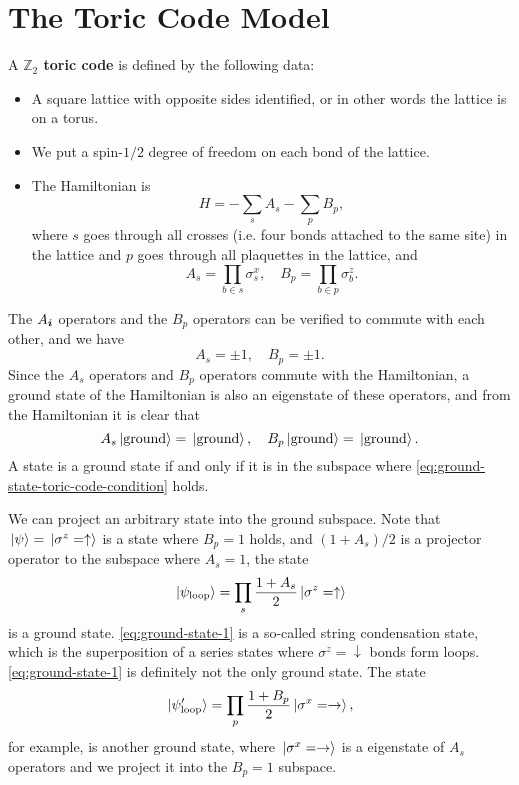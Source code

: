 \documentclass[hyperref, a4paper]{article}
\newcommand*{\concept}[1]{{\textbf{#1}}}
\begin{document}
\section{The Toric Code Model}

A \concept{$\mathbb{Z}_2$ toric code} is defined by the following data:
\begin{itemize}
    \item A square lattice with opposite sides identified, or in other words the lattice is on a torus.
    \item We put a spin-$1/2$ degree of freedom on each bond of the lattice.
    \item The Hamiltonian is 
    \begin{equation}
        H = - \sum_{s} A_{s} - \sum_{p} B_p,
        \label{eq:toric-code}
    \end{equation}
    where $s$ goes through all crosses (i.e. four bonds attached to the same site) in the lattice and $p$ goes through all plaquettes in the lattice, and 
    \begin{equation}
        A_s = \prod_{b \in s} \sigma^x_s, \quad B_p = \prod_{b \in p} \sigma^z_b.
    \end{equation}
\end{itemize}

The $A_{\vb*{i}}$ operators and the $B_{p}$ operators can be verified to commute with each other, and we have 
\begin{equation}
    A_s = \pm 1, \quad B_p = \pm 1.
\end{equation}
Since the $A_s$ operators and $B_p$ operators commute with the Hamiltonian, 
a ground state of the Hamiltonian is also an eigenstate of these operators, 
and from the Hamiltonian it is clear that 
\begin{equation}
    A_s \ket*{\text{ground}} = \ket*{\text{ground}}, \quad B_p \ket*{\text{ground}} = \ket*{\text{ground}}.
    \label{eq:ground-state-toric-code-condition}
\end{equation}
A state is a ground state if and only if it is in the subspace where \eqref{eq:ground-state-toric-code-condition} holds.

We can project an arbitrary state into the ground subspace. 
Note that $\ket*{\psi} = \ket*{\sigma^z = \uparrow}$ is a state where $B_p = 1$ holds, 
and $(1 + A_s)/{2}$ is a projector operator to the subspace where $A_s = 1$, the state 
\begin{equation}
    \ket*{\psi_\text{loop}} = \prod_s \frac{1 + A_s}{2} \ket*{\sigma^z = \uparrow}
    \label{eq:ground-state-1}
\end{equation}
is a ground state. \eqref{eq:ground-state-1} is a so-called string condensation state, 
which is the superposition of a series states where $\sigma^z = \downarrow$ bonds form loops.
\eqref{eq:ground-state-1} is definitely not the only ground state. 
The state
\begin{equation}
    \ket*{\psi_\text{loop}'} = \prod_p \frac{1 + B_p}{2} \ket*{\sigma^x = \rightarrow},
    \label{eq:ground-state-2}
\end{equation}
for example, is another ground state, 
where $\ket*{\sigma^x = \rightarrow}$ is a eigenstate of $A_s$ operators and we project it into the $B_p = 1$ subspace.
\end{document}
